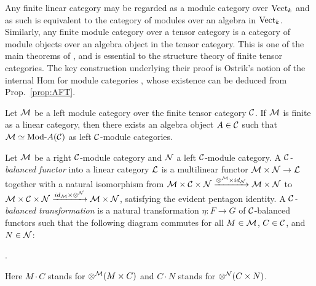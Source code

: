 \documentclass{amsart}
\begin{document}
Any finite linear category may be regarded as a module category over $\mathrm{Vect}_k$ and as such is equivalent to the category of modules over an algebra in $\mathrm{Vect}_k$. Similarly, any finite module category over a tensor category is a category of module objects over an algebra object in the tensor category.
This is one of the main theorems of \cite{EGNO}, and is essential to the structure theory of finite tensor categories.  The key construction underlying their proof is Ostrik's notion of the internal Hom for module categories \cite{MR1976459}, whose existence can be deduced from Prop.~\ref{prop:AFT}.

\begin{theorem} \label{thm:EGNO2.11.6} %
	Let $\mathcal M$ be a left module category over the finite tensor category $\mathcal C$. If $\mathcal M$ is finite as a linear category, then there exists an algebra object $A \in \mathcal C$ such that $\cM \simeq \Mod{}{A} (\cC)$ as left $\mathcal C$-module categories. 
\end{theorem}

\begin{definition}
	Let $\mathcal M$ be a right $\mathcal C$-module category and $\mathcal N$ a left $\mathcal C$-module category. A {\em $\mathcal C$-balanced functor} into a linear category $\mathcal L$ is a multilinear functor $\mathcal M \times \mathcal N \to \mathcal L$ together with a natural isomorphism from $\mathcal M \times \mathcal C \times \mathcal N \xrightarrow{\otimes^{\mathcal M} \times id_{\mathcal N}} \mathcal M \times \mathcal N$ to $\mathcal M \times \mathcal C \times \mathcal N \xrightarrow{id_{\mathcal M} \times \otimes^{\mathcal N}} \mathcal M \times \mathcal N$, satisfying the evident pentagon identity. A {\em $\mathcal C$-balanced transformation} is a natural transformation $\eta:F \to G$ of $\mathcal C$-balanced functors such that the following diagram commutes for all $M \in \mathcal M$, $C \in \mathcal C$, and $N \in \mathcal N$:
\begin{center}
.
\end{center}
\nid Here $M \cdot C$ stands for $\otimes^{\mathcal M}(M \times C)$ and $C \cdot N$ stands for $\otimes^{\mathcal N}(C \times N)$.
\end{definition}
\end{document}
